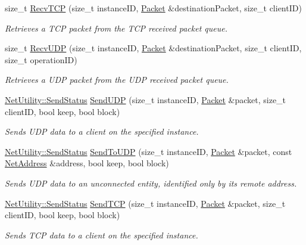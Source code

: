 \begin{DoxyCompactItemize}
size\_\-t \hyperlink{namespacemn_af95cb95140c98a5eeb54d7ef29ff1480}{RecvTCP} (size\_\-t instanceID, \hyperlink{class_packet}{Packet} \&destinationPacket, size\_\-t clientID)
\begin{DoxyCompactList}\small\item\em Retrieves a TCP packet from the TCP received packet queue. \item\end{DoxyCompactList}\item 
size\_\-t \hyperlink{namespacemn_a7ff7c0406f00568fbe51571ba3f87be1}{RecvUDP} (size\_\-t instanceID, \hyperlink{class_packet}{Packet} \&destinationPacket, size\_\-t clientID, size\_\-t operationID)
\begin{DoxyCompactList}\small\item\em Retrieves a UDP packet from the UDP received packet queue. \item\end{DoxyCompactList}\item 
\hyperlink{class_net_utility_a8051eca61204ffd818281419bbf44736}{NetUtility::SendStatus} \hyperlink{namespacemn_ad57dddf4d781b354113e5e3d74dc3a5a}{SendUDP} (size\_\-t instanceID, \hyperlink{class_packet}{Packet} \&packet, size\_\-t clientID, bool keep, bool block)
\begin{DoxyCompactList}\small\item\em Sends UDP data to a client on the specified instance. \item\end{DoxyCompactList}\item 
\hyperlink{class_net_utility_a8051eca61204ffd818281419bbf44736}{NetUtility::SendStatus} \hyperlink{namespacemn_a24c13b82fd717671e16d1d4dd9f5e16d}{SendToUDP} (size\_\-t instanceID, \hyperlink{class_packet}{Packet} \&packet, const \hyperlink{class_net_address}{NetAddress} \&address, bool keep, bool block)
\begin{DoxyCompactList}\small\item\em Sends UDP data to an unconnected entity, identified only by its remote address. \item\end{DoxyCompactList}\item 
\hyperlink{class_net_utility_a8051eca61204ffd818281419bbf44736}{NetUtility::SendStatus} \hyperlink{namespacemn_a93916238ec8d933a6e874660f7d3cc47}{SendTCP} (size\_\-t instanceID, \hyperlink{class_packet}{Packet} \&packet, size\_\-t clientID, bool keep, bool block)
\begin{DoxyCompactList}\small\item\em Sends TCP data to a client on the specified instance. \item\end{DoxyCompactList}\item 

\end{DoxyCompactItemize}
